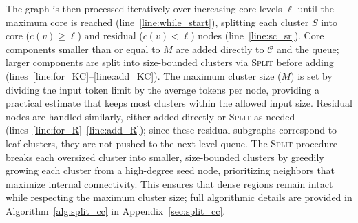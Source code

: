 \documentclass[sigconf]{acmart}
\begin{document}
The graph is then processed iteratively over increasing core levels $\ell$ until the maximum core is reached (line~\ref{line:while_start}), splitting each cluster $S$ into core ($c(v)\ge\ell$) and residual ($c(v)<\ell$) nodes (line~\ref{line:sc_sr}).
Core components smaller than or equal to $M$ are added directly to $\mathcal{C}$ and the queue; larger components are split into size-bounded clusters via \textsc{Split} before adding (lines~\ref{line:for_KC}–\ref{line:add_KC}).
The maximum cluster size ($M$) is set by dividing the input token limit by the average tokens per node, providing a practical estimate that keeps most clusters within the allowed input size.
Residual nodes are handled similarly, either added directly or \textsc{Split}  as needed (lines~\ref{line:for_R}–\ref{line:add_R}); since these residual subgraphs correspond to leaf clusters, they are not pushed to the next-level queue.
The \textsc{Split} procedure breaks each oversized cluster into smaller, size-bounded clusters by greedily growing each cluster from a high-degree seed node, prioritizing neighbors that maximize internal connectivity. This ensures that dense regions remain intact while respecting the maximum cluster size; full algorithmic details are provided in Algorithm~\ref{alg:split_cc} in Appendix~\ref{sec:split_cc}.
\end{document}
